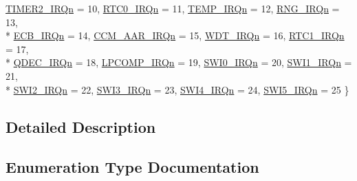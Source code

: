 \begin{DoxyCompactItemize}
\hyperlink{group__n_r_f51_gga7e1129cd8a196f4284d41db3e82ad5c8ad97a34027a8b1017d42d1d6320381e48}{T\+I\+M\+E\+R2\+\_\+\+I\+R\+Qn} = 10, 
\hyperlink{group__n_r_f51_gga7e1129cd8a196f4284d41db3e82ad5c8ae8f41637c6c07ef7b19337645fcd62de}{R\+T\+C0\+\_\+\+I\+R\+Qn} = 11, 
\hyperlink{group__n_r_f51_gga7e1129cd8a196f4284d41db3e82ad5c8a4345e1c5fe4eb605897ce68a9033ad36}{T\+E\+M\+P\+\_\+\+I\+R\+Qn} = 12, 
\hyperlink{group__n_r_f51_gga7e1129cd8a196f4284d41db3e82ad5c8a90c4647e57cff99fac635c532802c4b5}{R\+N\+G\+\_\+\+I\+R\+Qn} = 13, 
\\*
\hyperlink{group__n_r_f51_gga7e1129cd8a196f4284d41db3e82ad5c8a237dc3e67d77eb34c8eff78e677716a0}{E\+C\+B\+\_\+\+I\+R\+Qn} = 14, 
\hyperlink{group__n_r_f51_gga7e1129cd8a196f4284d41db3e82ad5c8a30b0f664b7d5926236c8bd75c2fb1f04}{C\+C\+M\+\_\+\+A\+A\+R\+\_\+\+I\+R\+Qn} = 15, 
\hyperlink{group__n_r_f51_gga7e1129cd8a196f4284d41db3e82ad5c8a78573b84a4133ef5812b33ce10dcba12}{W\+D\+T\+\_\+\+I\+R\+Qn} = 16, 
\hyperlink{group__n_r_f51_gga7e1129cd8a196f4284d41db3e82ad5c8a17a8b6fd704c515e9f5beee6795766f5}{R\+T\+C1\+\_\+\+I\+R\+Qn} = 17, 
\\*
\hyperlink{group__n_r_f51_gga7e1129cd8a196f4284d41db3e82ad5c8a59082da14040ed6cf7410cc2d0909c42}{Q\+D\+E\+C\+\_\+\+I\+R\+Qn} = 18, 
\hyperlink{group__n_r_f51_gga7e1129cd8a196f4284d41db3e82ad5c8af7f33fa618072c354353e433d357124e}{L\+P\+C\+O\+M\+P\+\_\+\+I\+R\+Qn} = 19, 
\hyperlink{group__n_r_f51_gga7e1129cd8a196f4284d41db3e82ad5c8a0885682fa5efb7ca655ac0b6ee0d3270}{S\+W\+I0\+\_\+\+I\+R\+Qn} = 20, 
\hyperlink{group__n_r_f51_gga7e1129cd8a196f4284d41db3e82ad5c8a3c692d1e7d777e2b22cc4503bec2f118}{S\+W\+I1\+\_\+\+I\+R\+Qn} = 21, 
\\*
\hyperlink{group__n_r_f51_gga7e1129cd8a196f4284d41db3e82ad5c8ac0f9fd91ceb111550590025b69348fe2}{S\+W\+I2\+\_\+\+I\+R\+Qn} = 22, 
\hyperlink{group__n_r_f51_gga7e1129cd8a196f4284d41db3e82ad5c8af3a19daf825b83ebc7adbe4cb4b3d48b}{S\+W\+I3\+\_\+\+I\+R\+Qn} = 23, 
\hyperlink{group__n_r_f51_gga7e1129cd8a196f4284d41db3e82ad5c8ad0060ce5f6a076331b53d60a985730d8}{S\+W\+I4\+\_\+\+I\+R\+Qn} = 24, 
\hyperlink{group__n_r_f51_gga7e1129cd8a196f4284d41db3e82ad5c8a982d8cc4b58ec339c80f4b0dd2a448e8}{S\+W\+I5\+\_\+\+I\+R\+Qn} = 25
 \}
\end{DoxyCompactItemize}


\subsection{Detailed Description}


\subsection{Enumeration Type Documentation}
\hypertarget{group__n_r_f51_ga7e1129cd8a196f4284d41db3e82ad5c8}{}
